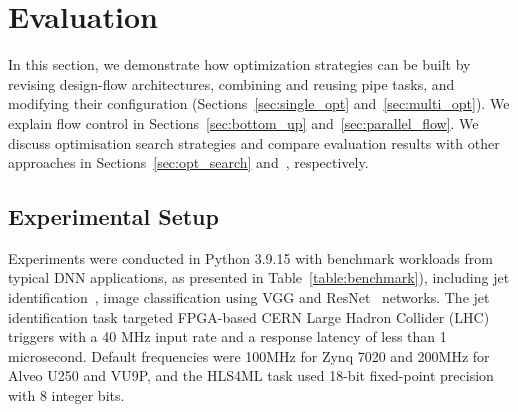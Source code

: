 





\section{Evaluation}\label{sec:evaluation}
In this section, we demonstrate how optimization strategies can be built by revising design-flow architectures, combining and reusing pipe tasks, and modifying their configuration (Sections~\ref{sec:single_opt} and~\ref{sec:multi_opt}). We explain flow control in Sections~\ref{sec:bottom_up} and~\ref{sec:parallel_flow}. We discuss optimisation search strategies and compare evaluation results with other approaches in Sections~\ref{sec:opt_search} and~, respectively.


\subsection{Experimental Setup}

Experiments were conducted in Python 3.9.15 with benchmark workloads from typical DNN applications, as presented in Table~\ref{table:benchmark}), including jet identification~\cite{duarte2018fast, moreno2020jedi}, image classification using VGG\cite{simonyan2014very} and ResNet~\cite{he2016deep} networks. 
The jet identification task targeted FPGA-based CERN Large Hadron Collider (LHC) triggers with a 40 MHz input rate and a response latency of less than 1 microsecond. Default frequencies were 100MHz for Zynq 7020 and 200MHz for Alveo U250 and VU9P, and the HLS4ML task used 18-bit fixed-point precision with 8 integer bits.

